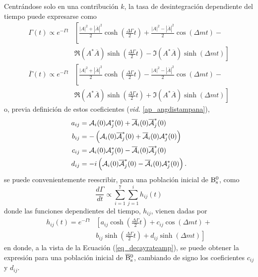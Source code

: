 Centrándose solo en una contribución $k$, la tasa de desintegración dependiente del tiempo puede expresarse como
\begin{equation}
\begin{split}
\Gamma (t)  \propto e^{-\Gamma t} &\left[\frac{|A|^2+|\overline{A}|^2}{2} \cosh \left(\frac{\Delta \Gamma}{2} t \right) + \frac{|A|^2-|\overline{A}|^2}{2} \cos \left(\Delta m t \right) \right. - \\ & \left. \Re (A^* \overline{A}) \sinh \left(\frac{\Delta \Gamma}{2} t \right) - \Im (A^* \overline{A}) \sinh \left(\Delta m t\right) \right] \\
\overline{\Gamma} (t)  \propto e^{-\Gamma t} &\left[\frac{|A|^2+|\overline{A}|^2}{2} \cosh \left(\frac{\Delta \Gamma}{2} t \right) - \frac{|A|^2-|\overline{A}|^2}{2} \cos \left(\Delta m t \right) \right. - \\ & \left. \Re (A^* \overline{A}) \sinh \left(\frac{\Delta \Gamma}{2} t \right) + \Im (A^* \overline{A}) \sinh \left(\Delta m t\right) \right] 
\end{split}	 \label{eq_decayrateamp}
\end{equation}
o, previa definición de estos coeficientes (\emph{vid.} \ref{ap_angdistampana}),
\begin{equation}
\begin{split}
a_{ij} &= \mathcal{A}_i(0) \mathcal{A}_j^*(0) + \overline{\mathcal{A}}_i (0) \overline{\mathcal{A}}_j^* (0)\\
b_{ij} &= -\left(\mathcal{A}_i(0) \overline{\mathcal{A}}_j^*(0) + \overline{\mathcal{A}}_i (0) \mathcal{A}_j^* (0) \right)\\
c_{ij} &= \mathcal{A}_i(0) \mathcal{A}_j^*(0) - \overline{\mathcal{A}}_i (0) \overline{\mathcal{A}}_j^* (0)\\
d_{ij} &= -i \left(\mathcal{A}_i(0) \overline{\mathcal{A}}_j^*(0) - \overline{\mathcal{A}}_i (0) \mathcal{A}_j^* (0) \right).
\end{split}
\end{equation}
se puede convenientemente reescribir, para una población inicial de $\text{B}{}_{\text{s}}^{\text{0}}$, como
\begin{equation}
	\frac{d\Gamma}{dt} \propto \sum_{i=1}^{7}\sum_{j=1}^i h_{ij}(t)
\end{equation}
donde las funciones dependientes del tiempo, $h_{ij}$, vienen dadas por 
\begin{equation}
\begin{split}
	h_{ij}(t) = e^{-\Gamma t} &\left[  a_{ij} \cosh \left(\frac{\Delta \Gamma}{2} t \right) + c_{ij} \cos \left(\Delta m t \right) \right. + \\ & \left. b_{ij} \sinh \left(\frac{\Delta \Gamma}{2} t \right) + d_{ij} \sinh \left(\Delta m t\right) \right]
\end{split}
\end{equation}
en donde, a la vista de la Ecuación (\ref{eq_decayrateamp}), se puede obtener la expresión para una población inicial de $\overline{\text{B}}{}_{\text{s}}^{\text{0}}$, cambiando de signo los coeficientes $c_{ij}$ y $d_{ij}$.


